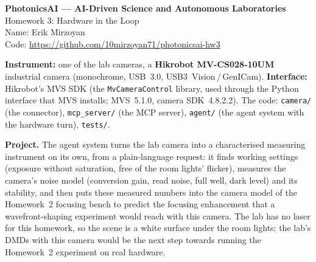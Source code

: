 \documentclass[11pt,a4paper]{article}
\newcommand{\studentname}{Erik Mirzoyan}
\newcommand{\repourl}{https://github.com/10mirzoyan71/photonicsai-hw3}
\begin{document}
\begin{center}
{\Large\bfseries PhotonicsAI --- AI-Driven Science and Autonomous Laboratories}\\[3pt]
{\large Homework 3: Hardware in the Loop}\\[6pt]
Name: \studentname\\[2pt]
Code: \url{\repourl}
\end{center}

\textbf{Instrument:} one of the lab cameras, a \textbf{Hikrobot MV-CS028-10UM} industrial camera (monochrome, USB~3.0,
USB3~Vision\,/\,GenICam). \textbf{Interface:} Hikrobot's MVS SDK (the \texttt{MvCameraControl} library, used through the Python
interface that MVS installs; MVS~5.1.0, camera SDK~4.8.2.2).
The code: \texttt{camera/} (the connector), \texttt{mcp\_server/} (the MCP server), \texttt{agent/} (the agent system with the
hardware turn), \texttt{tests/}.

\textbf{Project.} The agent system turns the lab camera into a characterised measuring instrument on its own, from a
plain-language request: it finds working settings (exposure without saturation, free of the room lights' flicker),
measures the camera's noise model (conversion gain, read noise, full well, dark level) and its stability, and then puts
these measured numbers into the camera model of the Homework~2 focusing bench to predict the focusing enhancement that a
wavefront-shaping experiment would reach with this camera. The lab has no laser for this homework, so the scene is a white
surface under the room lights; the lab's DMDs with this camera would be the next step towards running the Homework~2
experiment on real hardware.

\end{document}
